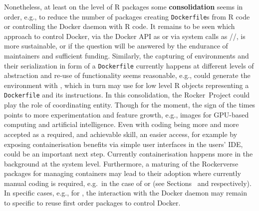 Nonetheless, at least on the level of R packages some
\textbf{consolidation} seems in order, e.g., to reduce the number of
packages creating \texttt{Dockerfile}s from R code or controlling the
Docker daemon with R code. It remains to be seen which approach to
control Docker, via the Docker API as  or via system
calls as //, is more sustainable,
or if the question will be answered by the endurance of maintainers and
sufficient funding. Similarly, the capturing of environments and their
serialization in form of a \texttt{Dockerfile} currently happens at
different levels of abstraction and re-use of functionality seems
reasonable, e.g.,  could generate the environment with
, which in turn may use  for low level
R objects representing a \texttt{Dockerfile} and its instructions. In
this consolidation, the Rocker~Project could play the role of
coordinating entity. Though for the moment, the sign of the times points
to more experimentation and feature growth, e.g., images for GPU-based
computing and artificial intelligence. Even with coding being more and
more accepted as a required, and achievable skill, an easier access, for
example by exposing containerisation benefits via simple user interfaces
in the users' IDE, could be an important next step. Currently
containerisation happens more in the background at the system level.
Furthermore, a maturing of the Rockerverse packages for managing
containers may lead to their adoption where currently manual coding is
required, e.g.~in the case of  or 
(see Sections~ and  respectively). In
specific cases, e.g., for , the interaction with the
Docker daemon may remain to specific to reuse first order packages to
control Docker.

